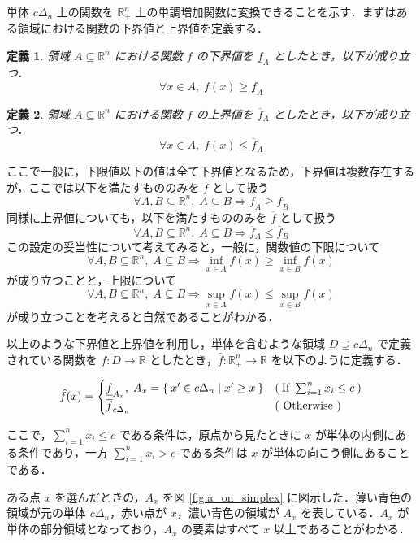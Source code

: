 \documentclass[a4paper,11pt]{jreport}
\newtheorem{definition}{定義}
\begin{document}
単体 $ c \Delta_n $ 上の関数を $ \mathbb{R}_+^n $ 上の単調増加関数に変換できることを示す．まずはある領域における関数の下界値と上界値を定義する．

\begin{definition}
領域 $ A \subseteq \mathbb{R}^n $ における関数 $ f $ の下界値を $ \underline{f}_A $ としたとき，以下が成り立つ．
$$ \forall x \in A, \; f(x) \geq \underline{f}_A $$
\end{definition}

\begin{definition}
領域 $ A \subseteq \mathbb{R}^n $ における関数 $ f $ の上界値を $ \overline{f}_A $ としたとき，以下が成り立つ．
$$ \forall x \in A, \; f(x) \leq \overline{f}_A $$
\end{definition}

ここで一般に，下限値以下の値は全て下界値となるため，下界値は複数存在するが，ここでは以下を満たすもののみを $ \underline{f} $ として扱う
$$ \forall A, B \subseteq \mathbb{R}^n, \; A \subseteq B \Rightarrow \underline{f}_A \geq \underline{f}_B $$
同様に上界値についても，以下を満たすもののみを $ \overline{f} $ として扱う
$$ \forall A, B \subseteq \mathbb{R}^n, \; A \subseteq B \Rightarrow \overline{f}_A \leq \overline{f}_B $$
この設定の妥当性について考えてみると，一般に，関数値の下限について
$$ \forall A, B \subseteq \mathbb{R}^n, \; A \subseteq B \Rightarrow \inf_{x \in A}f(x) \geq \inf_{x \in B}f(x) $$
が成り立つことと，上限について
$$ \forall A, B \subseteq \mathbb{R}^n, \; A \subseteq B \Rightarrow \sup_{x \in A}f(x) \leq \sup_{x \in B}f(x) $$
が成り立つことを考えると自然であることがわかる．\par
以上のような下界値と上界値を利用し，単体を含むような領域 $ D \supseteq c \Delta_n $ で定義されている関数を $ f : D \to \mathbb{R} $ としたとき，$ \hat{f} : \mathbb{R}_+^n \to \mathbb{R} $ を以下のように定義する．

\begin{align*}
\hat{f}(x) =
\begin{cases}
\underline{f}_{A_x}, \; A_x = \Set{x' \in c \Delta_n | x' \geq x } & ( \: \mbox{If } \sum_{i=1}^{n}x_i \leq c \: ) \\
\overline{f}_{c \Delta_n} & (\mbox{ Otherwise })
\end{cases}
\end{align*}

ここで，$ \sum_{i=1}^{n}x_i \leq c $ である条件は，原点から見たときに $ x $ が単体の内側にある条件であり，一方 $ \sum_{i=1}^{n}x_i > c $ である条件は $ x $ が単体の向こう側にあることである．\par
ある点 $ x $ を選んだときの，$ A_x $ を図 \ref{fig:a_on_simplex} に図示した．薄い青色の領域が元の単体 $ c \Delta_n $，赤い点が $ x $，濃い青色の領域が $ A_x $ を表している．$ A_x $ が単体の部分領域となっており，$ A_x $ の要素はすべて $ x $ 以上であることがわかる．\par
\end{document}
